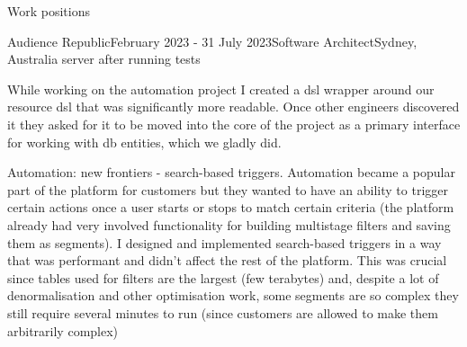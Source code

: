 \documentclass{resume} %
\begin{document}
\begin{rSection}{Work positions}
\begin{rSubsection}{Audience Republic}{February 2023 - 31 July 2023}{Software Architect}{Sydney, Australia}
    server after running tests
\item While working on the automation project I created a dsl wrapper around our resource dsl that was significantly more readable.
    Once other engineers discovered it they asked for it to be moved into the core of the project as a primary interface for working
    with db entities, which we gladly did.
\item Automation: new frontiers - search-based triggers. Automation became a popular part of the platform for customers but they wanted
    to have an ability to trigger certain actions once a user starts or stops to match certain criteria (the platform already had very
    involved functionality for building multistage filters and saving them as segments). I designed and implemented search-based triggers
    in a way that was performant and didn't affect the rest of the platform. This was crucial since tables used for filters are the
    largest (few terabytes) and, despite a lot of denormalisation and other optimisation work, some segments are so complex they still require 
    several minutes to run (since customers are allowed to make them arbitrarily complex)
~
\end{rSubsection}


\end{rSection}
\end{document}
